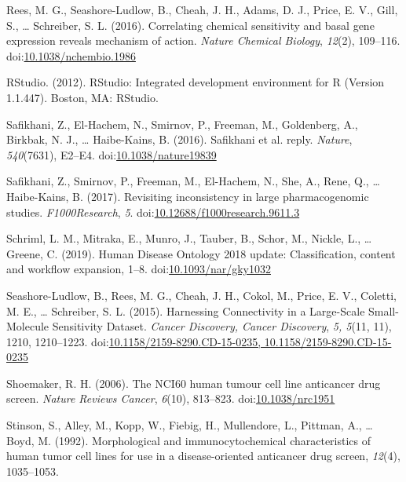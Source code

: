 \documentclass[man]{apa6}
\begin{document}
\hypertarget{ref-rees2016}{}
Rees, M. G., Seashore-Ludlow, B., Cheah, J. H., Adams, D. J., Price, E.
V., Gill, S., \ldots{} Schreiber, S. L. (2016). Correlating chemical
sensitivity and basal gene expression reveals mechanism of action.
\emph{Nature Chemical Biology}, \emph{12}(2), 109--116.
doi:\href{https://doi.org/10.1038/nchembio.1986}{10.1038/nchembio.1986}

\hypertarget{ref-rstudio2012}{}
RStudio. (2012). RStudio: Integrated development environment for R
(Version 1.1.447). Boston, MA: RStudio.

\hypertarget{ref-safikhani2016}{}
Safikhani, Z., El-Hachem, N., Smirnov, P., Freeman, M., Goldenberg, A.,
Birkbak, N. J., \ldots{} Haibe-Kains, B. (2016). Safikhani et al. reply.
\emph{Nature}, \emph{540}(7631), E2--E4.
doi:\href{https://doi.org/10.1038/nature19839}{10.1038/nature19839}

\hypertarget{ref-safikhani2017}{}
Safikhani, Z., Smirnov, P., Freeman, M., El-Hachem, N., She, A., Rene,
Q., \ldots{} Haibe-Kains, B. (2017). Revisiting inconsistency in large
pharmacogenomic studies. \emph{F1000Research}, \emph{5}.
doi:\href{https://doi.org/10.12688/f1000research.9611.3}{10.12688/f1000research.9611.3}

\hypertarget{ref-schriml2019}{}
Schriml, L. M., Mitraka, E., Munro, J., Tauber, B., Schor, M., Nickle,
L., \ldots{} Greene, C. (2019). Human Disease Ontology 2018 update:
Classification, content and workflow expansion, 1--8.
doi:\href{https://doi.org/10.1093/nar/gky1032}{10.1093/nar/gky1032}

\hypertarget{ref-seashore-ludlow2015}{}
Seashore-Ludlow, B., Rees, M. G., Cheah, J. H., Cokol, M., Price, E. V.,
Coletti, M. E., \ldots{} Schreiber, S. L. (2015). Harnessing
Connectivity in a Large-Scale Small-Molecule Sensitivity Dataset.
\emph{Cancer Discovery, Cancer Discovery}, \emph{5, 5}(11, 11), 1210,
1210--1223.
doi:\href{https://doi.org/10.1158/2159-8290.CD-15-0235,\%2010.1158/2159-8290.CD-15-0235}{10.1158/2159-8290.CD-15-0235, 10.1158/2159-8290.CD-15-0235}

\hypertarget{ref-shoemaker2006}{}
Shoemaker, R. H. (2006). The NCI60 human tumour cell line anticancer
drug screen. \emph{Nature Reviews Cancer}, \emph{6}(10), 813--823.
doi:\href{https://doi.org/10.1038/nrc1951}{10.1038/nrc1951}

\hypertarget{ref-stinson1992}{}
Stinson, S., Alley, M., Kopp, W., Fiebig, H., Mullendore, L., Pittman,
A., \ldots{} Boyd, M. (1992). Morphological and immunocytochemical
characteristics of human tumor cell lines for use in a disease-oriented
anticancer drug screen, \emph{12}(4), 1035--1053.
\end{document}
